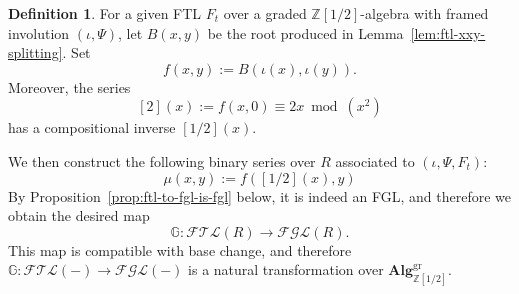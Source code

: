 \documentclass[a4paper]{amsart}
\theoremstyle{plain}
\theoremstyle{definition}
\newtheorem{definition}[subsubsection]{Definition}
\newcommand{\ZZ}{\mathbb{Z}}
\begin{document}
\begin{definition}
	For a given FTL $F_t$ over a graded $\ZZ[1/2]$-algebra with framed involution $(\iota, \Psi)$, let $B(x,y)$ be the root produced in Lemma~\ref{lem:ftl-xxy-splitting}.
	Set
	\[
		f(x,y):=B(\iota(x),\iota(y)).
	\]
	Moreover, the series
	\[
		[2](x):=f(x,0)\equiv 2x \bmod (x^2)
	\]
	has a compositional inverse $[1/2](x)$.

	We then construct the following binary series over $R$ associated to $(\iota, \Psi, F_t)$:
	\begin{equation}\label{eq:ftl-to-fgl}
		\mu(x,y):=f([1/2](x),y)
	\end{equation}
	By Proposition~\ref{prop:ftl-to-fgl-is-fgl} below, it is indeed an FGL, and therefore we obtain the desired map
	\[
		\mathbb{G}: \mathcal{FTL}(R) \to \mathcal{FGL}(R).
	\]
	This map is compatible with base change, and therefore $\mathbb{G}: \mathcal{FTL}(-) \to \mathcal{FGL}(-)$ is a natural transformation over $\mathbf{Alg}^{\mathrm{gr}}_{\ZZ[1/2]}$.
\end{definition}
\end{document}
